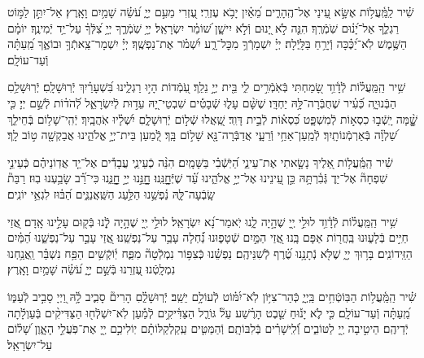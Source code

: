 \documentclass[twoside, openany, parskip=half, 11pt]{book}
\begin{document}
שִׁ֗יר לַֽמַּֽ֫עֲל֥וֹת אֶשָּׂ֣א עֵ֭ינַי אֶל־הֶֽהָרִ֑ים מֵ֝אַ֗יִן יָבֹ֥א עֶזְרִֽי׃ עֶ֭זְרִי מֵעִ֣ם יְיָ֑ עֹ֝שֵׂ֗ה שָׁמַ֥יִם וָאָֽרֶץ׃ אַל־יִתֵּ֣ן לַמּ֣וֹט רַגְלֶ֑ךָ אַל־יָ֝נ֗וּם שֹֽׁמְֿרֶֽךָ׃ הִנֵּ֤ה לֹ֣א יָ֭נוּם וְֿלֹ֣א יִישָׁ֑ן שׁ֝וֹמֵ֗ר יִשְׂרָאֵֽל׃ יְיָ֥ שֹֽׁמְֿרֶ֑ךָ יְיָ֥ צִ֝לְּֿךָ֗ עַל־יַ֥ד יְֿמִינֶֽךָ׃ יוֹמָ֗ם הַשֶּׁ֥מֶשׁ לֹֽא־יַ֝כֶּ֗כָּה וְֿיָרֵ֥חַ בַּלָּֽיְֿלָה׃ יְיָ֗ יִשְׁמָרְֿךָ֥ מִכׇּל־רָ֑ע יִ֝שְׁמֹ֗ר אֶת־נַפְשֶֽׁךָ׃ יְיָ֗ יִשְׁמָר־צֵֽאתְֿךָ֥ וּבוֹאֶ֑ךָ מֵֽ֝עַתָּ֗ה וְֿעַד־עוֹלָֽם׃

שִׁ֥יר הַֽמַּֽעֲל֗וֹת לְֿדָ֫וִ֥ד שָׂ֭מַחְתִּי בְּֿאֹֽמְֿרִ֣ים לִ֑י בֵּ֖ית יְיָ֣ נֵלֵֽךְ׃ עֹֽ֭מְֿדוֹת הָי֣וּ רַגְלֵ֑ינוּ בִּ֝שְׁעָרַ֗יִךְ יְֿרֽוּשָׁלָֽםִ׃ יְֿרֽוּשָׁלַ֥םִ הַבְּֿנוּיָ֑ה כְּֿ֝עִ֗יר שֶׁחֻבְּֿרָה־לָּ֥הּ יַחְדָּֽו׃ שֶׁשָּׁ֨ם עָל֢וּ שְֿׁבָטִ֡ים שִׁבְטֵי־יָ֭הּ עֵד֣וּת לְֿיִשְׂרָאֵ֑ל לְֿ֝הֹד֗וֹת לְֿשֵׁ֣ם יְיָ׃ כִּ֤י שׇׇׇָׁ֨מָּה יָֽשְֿׁב֣וּ כִסְא֣וֹת לְֿמִשְׁפָּ֑ט כִּ֝סְא֗וֹת לְֿבֵ֣ית דָּוִֽד׃ שַֽׁ֭אֲלוּ שְֿׁל֣וֹם יְֿרֽוּשָׁלָ֑םִ יִ֝שְׁלָ֗יוּ אֹֽהֲבָֽיִךְ׃ יְֿהִֽי־שָׁל֥וֹם בְּֿחֵילֵ֑ךְ שַׁ֝לְוָ֗ה בְּֿאַרְמְֿנוֹתָֽיִךְ׃ לְֿמַֽעַן־אַחַ֥י וְֿרֵעָ֑י אֲדַבְּֿרָה־נָּ֖א שָׁל֣וֹם בָּֽךְ׃ לְֿ֭מַעַן בֵּית־יְיָ֣ אֱלֹהֵ֑ינוּ אֲבַקְשָׁ֖ה ט֣וֹב לָֽךְ׃

שִׁ֗יר הַֽמַּֽ֫עֲל֥וֹת אֵ֭לֶיךָ נָשָׂ֣אתִי אֶת־עֵינַ֑י הַ֝יֹּֽשְֿׁבִ֗י בַּשָּׁמָֽיִם׃ הִנֵּ֨ה כְֿעֵינֵ֢י עֲבָדִ֡ים אֶל־יַ֤ד אֲדֽוֹנֵיהֶ֗ם כְּֿעֵינֵ֣י שִׁפְחָה֘ אֶל־יַד֢ גְּֿבִ֫רְתָּ֥הּ כֵּ֣ן עֵ֭ינֵינוּ אֶל־יְיָ֣ אֱלֹהֵ֑ינוּ עַ֝֗ד שֶׁיְּֿחׇׇׇׇׇָנֵּֽנוּ׃ חׇׇׇׇָנֵּ֣נוּ יְיָ֣ חׇׇׇׇָנֵּ֑נוּ כִּי־רַ֝֗ב שָׂבַ֥עְנוּ בֽוּז׃ רַבַּת֘ שָֽׂבְֿעָה־לָּ֢הּ נַ֫פְשֵׁ֥נוּ הַלַּ֥עַג הַשַּֽׁאֲנַנִּ֑ים הַ֝בּ֗וּז לִגְאֵ֥י יוֹנִֽים׃


שִׁ֥יר הַֽמַּֽעֲל֗וֹת לְֿדָ֫וִ֥ד לוּלֵ֣י יְ֖יָ שֶׁהָ֣יָה לָ֑נוּ יֹֽאמַר־נָ֝א יִשְׂרָאֵֽל׃ לוּלֵ֣י יְ֖יָ שֶׁהָ֣יָה לָֿ֑נוּ בְּֿק֖וּם עָלֵ֣ינוּ אָֽדָם׃ אֲ֭זַי חַיִּ֣ים בְּֿלָע֑וּנוּ בַּֽחֲר֖וֹת אַפָּם בָּֽנוּ׃ אֲ֭זַי הַמַּ֣יִם שְֿׁטָפ֑וּנוּ נַ֝֗חְלָה עָבַ֥ר עַל־נַפְשֵֽׁנוּ׃ אֲ֭זַי עָבַ֣ר עַל־נַפְשֵׁ֑נוּ הַ֝מַּ֗יִם הַזֵּֽידוֹנִֽים׃ בָּר֥וּךְ יְיָ֑ שֶׁלֹּ֖א נְֿתָנָ֥נוּ טֶ֝֗רֶף לְֿשִׁנֵּיהֶֽם׃ נַפְשֵׁ֗נוּ כְּֿצִפּ֥וֹר נִמְלְֿטָה֘ מִפַּ֢ח יֽ֫וֹקְֿשִׁ֥ים הַפַּ֥ח נִשְׁבַּ֗ר וַֽאֲנַ֥חְנוּ נִמְלָֽטְֿנוּ׃ עֶ֭זְרֵנוּ בְּֿשֵׁ֣ם יְיָ֑ עֹ֝שֵׂ֗ה שָׁמַ֥יִם וָאָֽרֶץ׃

שִׁ֗יר הַֽמַּֽ֫עֲל֥וֹת הַבּֽוֹטְֿחִ֥ים בַּֽיְיָ֑ כְּֿהַר־צִיּ֥וֹן לֹֽא־יִ֝מּ֗וֹט לְֿעוֹלָ֥ם יֵשֵֽׁב׃ יְֿרְוּשָׁלְַ֗םִ הָרִים֘ סָבִ֢יב לָ֥֫הּ וַ֭יְיָ סָבִ֣יב לְֿעַמּ֑וֹ מֵֽ֝עַתָּ֗ה וְֿעַד־עוֹלָֽם׃ כִּ֤י לֹ֢א יָנ֡וּחַ שֵׁ֤בֶט הָרֶ֗שַׁע עַל֘ גּוֹרַ֢ל הַצַּדִּ֫יקִ֥ים לְֿמַ֡עַן לֹֽא־יִשְׁלְֿח֖וּ הַצַּדִּיקִ֨ים בְּֿעַוְלָ֬תָה יְֿדֵיהֶֽם׃ הֵיטִ֣יבָה יְ֖יָ לַטּוֹבִ֑ים וְֿ֝לִֽישָׁרִ֗ים בְּֿלִבּוֹתָֽם׃ וְֿהַמַּטִּ֤ים עַֽקַלְקַלּוֹתָ֗ם יֽוֹלִיכֵ֣ם יְ֖יָ אֶת־פֹּֽעֲלֵ֣י הָאָ֑וֶן שָׁ֝ל֗וֹם עַל־יִשְׂרָאֵֽל׃
\end{document}
